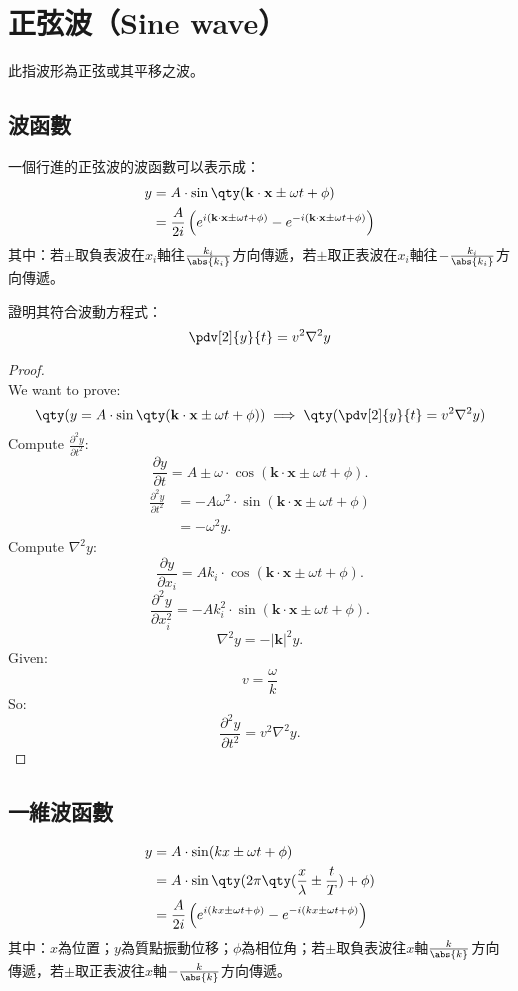 \documentclass[a4paper,12pt]{report}
\begin{document}
\section{正弦波（Sine wave）}
此指波形為正弦或其平移之波。
\subsection{波函數}
一個行進的正弦波的波函數可以表示成：
\[\begin{aligned}
y &= A \cdot \sin\qty(\mathbf{k} \cdot \mathbf{x} \pm \omega t + \phi) \\
&= \frac{A}{2i} \left(e^{i(\mathbf{k} \cdot \mathbf{x} \pm \omega t + \phi)} - e^{-i(\mathbf{k} \cdot \mathbf{x} \pm \omega t + \phi)} \right)
\end{aligned}\]
其中：若$\pm$取負表波在$x_i$軸往$\frac{k_i}{\abs{k_i}}$方向傳遞，若$\pm$取正表波在$x_i$軸往$-\frac{k_i}{\abs{k_i}}$方向傳遞。

證明其符合波動方程式：
\[\pdv[2]{y}{t}=v^2\nabla^2y\]
\begin{proof}\mbox{}\\
We want to prove:
\[ \qty(y = A \cdot \sin\qty(\mathbf{k} \cdot \mathbf{x} \pm \omega t + \phi))\implies\qty(\pdv[2]{y}{t}=v^2\nabla^2y)\]
Compute \(\frac{\partial^2 y}{\partial t^2}\):
\[\frac{\partial y}{\partial t} = A \pm\omega \cdot \cos\left(\mathbf{k} \cdot \mathbf{x} \pm \omega t + \phi\right).\]
\[\begin{aligned}
\frac{\partial^2 y}{\partial t^2} &= -A \omega^2 \cdot \sin\left(\mathbf{k} \cdot \mathbf{x} \pm \omega t + \phi\right)\\
&= -\omega^2 y.
\end{aligned}\]
Compute \(\nabla^2 y\):
\[
\frac{\partial y}{\partial x_i} = Ak_i \cdot \cos\left(\mathbf{k} \cdot \mathbf{x} \pm \omega t + \phi\right).
\]
\[
\frac{\partial^2 y}{\partial x_i^2} = -Ak_i^2 \cdot \sin\left(\mathbf{k} \cdot \mathbf{x} \pm \omega t + \phi\right).
\]
\[
\nabla^2 y = -|\mathbf{k}|^2 y.
\]
Given:
\[
v = \frac{\omega}{k}
\]
So:
\[
\frac{\partial^2 y}{\partial t^2} = v^2 \nabla^2 y.
\]
\end{proof}
\subsection{一維波函數}
\[\begin{aligned}
y &=A\cdot\sin(kx\pm\omega t+\phi)\\
&= A\cdot\sin\qty(2\pi\qty(\frac{x}{\lambda}\pm\frac{t}{T})+\phi)\\
&= \frac{A}{2i} \left(e^{i(kx \pm \omega t + \phi)} - e^{-i(kx \pm \omega t + \phi)} \right)
\end{aligned}\]
其中：$x$為位置；$y$為質點振動位移；$\phi$為相位角；若$\pm$取負表波往$x$軸$\frac{k}{\abs{k}}$方向傳遞，若$\pm$取正表波往$x$軸$-\frac{k}{\abs{k}}$方向傳遞。
\end{document}
